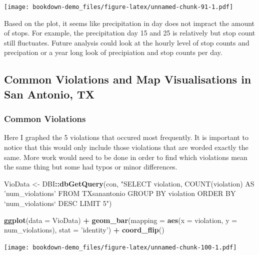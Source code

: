 \documentclass[
]{book}
\newenvironment{Shaded}{\begin{snugshade}}{\end{snugshade}}
\newcommand{\DataTypeTok}[1]{\textcolor[rgb]{0.13,0.29,0.53}{#1}}
\newcommand{\KeywordTok}[1]{\textcolor[rgb]{0.13,0.29,0.53}{\textbf{#1}}}
\newcommand{\NormalTok}[1]{#1}
\newcommand{\OperatorTok}[1]{\textcolor[rgb]{0.81,0.36,0.00}{\textbf{#1}}}
\newcommand{\StringTok}[1]{\textcolor[rgb]{0.31,0.60,0.02}{#1}}
\begin{document}
\texttt{[image: bookdown-demo\_files/figure-latex/unnamed-chunk-91-1.pdf]}

Based on the plot, it seems like precipitation in day does not impract the amount of stops. For example, the precipitation day 15 and 25 is relatively but stop count still fluctuates. Future analysis could look at the hourly level of stop counts and precipation or a year long look of precipiation and stop counts per day.

\hypertarget{common-violations-and-map-visualisations-in-san-antonio-tx}{%
\subsection{Common Violations and Map Visualisations in San Antonio, TX}\label{common-violations-and-map-visualisations-in-san-antonio-tx}}

\hypertarget{common-violations}{%
\subsubsection{Common Violations}\label{common-violations}}

Here I graphed the 5 violations that occured most frequently. It is important to notice that this would only include those violations that are worded exactly the same. More work would need to be done in order to find which violations mean the same thing but some had typos or minor differences.

\begin{Shaded}
\begin{Highlighting}[]
\NormalTok{VioData <-}\StringTok{ }\NormalTok{DBI}\OperatorTok{::}\KeywordTok{dbGetQuery}\NormalTok{(con,}
  \StringTok{"SELECT violation, COUNT(violation) AS 'num_violations' FROM TXsanantonio}
\StringTok{  GROUP BY violation}
\StringTok{  ORDER BY `num_violations` DESC}
\StringTok{  LIMIT 5"}\NormalTok{)}

\KeywordTok{ggplot}\NormalTok{(}\DataTypeTok{data =}\NormalTok{ VioData) }\OperatorTok{+}\StringTok{ }\KeywordTok{geom_bar}\NormalTok{(}\DataTypeTok{mapping =} \KeywordTok{aes}\NormalTok{(}\DataTypeTok{x =}\NormalTok{ violation, }\DataTypeTok{y =}\NormalTok{ num_violations), }
                                  \DataTypeTok{stat =} \StringTok{'identity'}\NormalTok{) }\OperatorTok{+}\StringTok{ }\KeywordTok{coord_flip}\NormalTok{()}
\end{Highlighting}
\end{Shaded}

\texttt{[image: bookdown-demo\_files/figure-latex/unnamed-chunk-100-1.pdf]}
\end{document}
